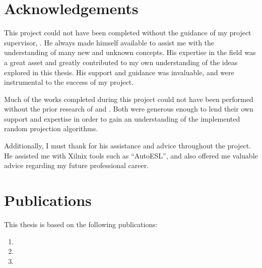 \documentclass[a4paper]{report}
\begin{document}

\chapter*{Acknowledgements}
This project could not have been completed without the guidance of my project 
supervisor, \supervisorName{}. He always made himself available to assist me 
with the understanding of many new and unknown concepts. His expertise in the 
field was a great asset and greatly contributed to my own understanding of the 
ideas explored in this thesis. His support and guidance was invaluable, and were
instrumental to the success of my project. 

Much of the works completed during this project could not have been performed 
without the prior research of  and . Both were
generous enough to lend their own support and expertise in order to gain an 
understanding of the implemented random projection algorithms.

Additionally, I must thank  for his assistance and advice 
throughout the project. He assisted me with Xilnix tools such as ``AutoESL'', 
and also offered me valuable advice regarding my future professional career.

\chapter*{Publications}
This thesis is based on the following publications:
\begin{enumerate}
\item {}
\item {}
\item {}
\end{enumerate}
\end{document}
